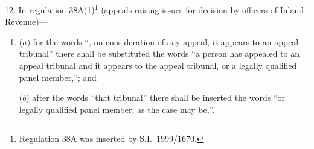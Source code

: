 \documentclass[12pt,a4paper]{article}
\begin{document}
\medskip

12.  In regulation 38A(1)\footnote{Regulation 38A was inserted by S.I.\ 1999/1670.} (appeals raising issues for decision by officers of Inland Revenue)—
\begin{enumerate}\item[]
($a$) for the words “, on consideration of any appeal, it appears to an appeal tribunal” there shall be substituted the words “a person has appealed to an appeal tribunal and it appears to the appeal tribunal, or a legally qualified panel member,”; and

($b$) after the words “that tribunal” there shall be inserted the words “or legally qualified panel member, as the case may be,”.
\end{enumerate}

\end{document}
